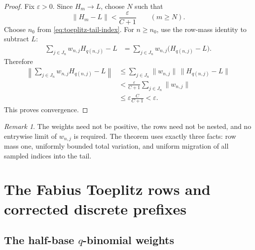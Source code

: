 \documentclass[11pt,oneside]{article}
\theoremstyle{definition}
\theoremstyle{remark}
\newtheorem{remark}[theorem]{Remark}
\begin{document}
\begin{proof}
Fix $\varepsilon>0$.  Since $H_m\to L$, choose $N$ such that
\begin{equation}
 \|H_m-L\|<\frac{\varepsilon}{C+1}
 \qquad(m\ge N).
 \label{eq:toeplitz-tail-error}
\end{equation}
Choose $n_0$ from \eqref{eq:toeplitz-tail-index}.  For $n\ge n_0$, use the row-mass identity
to subtract $L$:
\begin{align*}
 \sum_{j\in J_n}w_{n,j}H_{q(n,j)}-L
 &=\sum_{j\in J_n}w_{n,j}\bigl(H_{q(n,j)}-L\bigr).
\end{align*}
Therefore
\begin{align*}
 \left\|\sum_{j\in J_n}w_{n,j}H_{q(n,j)}-L\right\|
 &\le\sum_{j\in J_n}\|w_{n,j}\|\,\|H_{q(n,j)}-L\|\\
 &<\frac{\varepsilon}{C+1}\sum_{j\in J_n}\|w_{n,j}\|\\
 &\le\varepsilon\frac{C}{C+1}<\varepsilon.
\end{align*}
This proves convergence.
\end{proof}

\begin{remark}
The weights need not be positive, the rows need not be nested, and no entrywise limit of
$w_{n,j}$ is required.  The theorem uses exactly three facts: row mass one, uniformly bounded
total variation, and uniform migration of all sampled indices into the tail.
\end{remark}

\section{The Fabius Toeplitz rows and corrected discrete prefixes}
\label{sec:fabius-toeplitz}

\subsection{The half-base \texorpdfstring{$q$}{q}-binomial weights}
\end{document}
